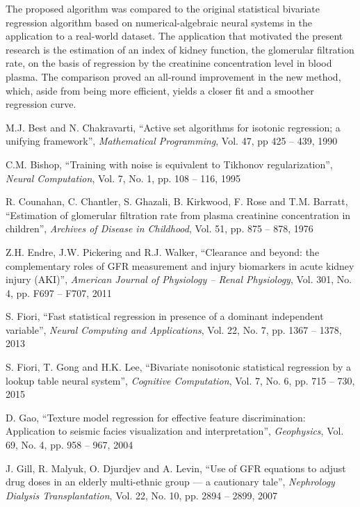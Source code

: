 \documentclass[10pt,final]{siamltex}
\begin{document}
The proposed algorithm was compared to the original statistical bivariate regression algorithm based on numerical-algebraic neural systems in the application to a real-world dataset. The application that motivated the present research is the estimation of an index of kidney function, the glomerular filtration rate, on the basis of regression by the creatinine concentration level in blood plasma. The comparison proved an all-round improvement in the new method, which, aside from being more efficient, yields a closer fit and a smoother regression curve.
%
\begin{thebibliography}{99}
   M.J. Best and N. Chakravarti, ``Active set algorithms for isotonic regression; a unifying framework'', \textit{Mathematical Programming}, Vol. 47, pp 425 -- 439, 1990

   C.M. Bishop, ``Training with noise is equivalent to Tikhonov regularization'', \textit{Neural Computation}, Vol. 7, No. 1, pp. 108 -- 116, 1995

   R. Counahan, C. Chantler, S. Ghazali, B. Kirkwood, F. Rose and T.M. Barratt, ``Estimation of glomerular filtration rate from plasma creatinine concentration in children'', \textit{Archives of Disease in Childhood},  Vol. 51, pp. 875 -- 878, 1976

   Z.H. Endre, J.W. Pickering and R.J. Walker, ``Clearance and beyond: the complementary roles of GFR measurement and injury biomarkers in acute kidney injury (AKI)'', \textit{American Journal of Physiology -- Renal Physiology}, Vol. 301, No. 4, pp. F697 -- F707, 2011

   S. Fiori, ``Fast statistical regression in presence of a dominant independent variable'', \textit{Neural Computing and Applications}, Vol. 22, No. 7, pp. 1367 -- 1378, 2013

   S. Fiori, T. Gong and H.K. Lee, ``Bivariate nonisotonic statistical regression by a lookup table neural system'', \textit{Cognitive Computation}, Vol. 7, No. 6, pp. 715 -- 730, 2015

   D. Gao, ``Texture model regression for effective feature discrimination: Application to seismic facies visualization and interpretation'', \textit{Geophysics}, Vol. 69, No. 4, pp. 958 -- 967, 2004

   J. Gill, R. Malyuk, O. Djurdjev and A. Levin, ``Use of GFR equations to adjust drug doses in an elderly multi-ethnic group --- a cautionary tale'', \textit{Nephrology Dialysis Transplantation}, Vol. 22, No. 10, pp. 2894 -- 2899, 2007


\end{thebibliography}
\end{document}
